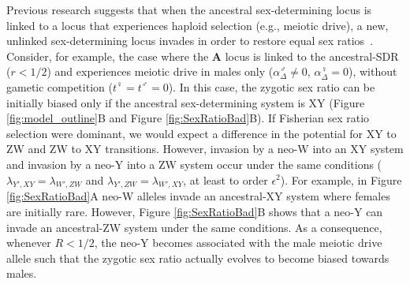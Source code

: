\documentclass[10pt,letterpaper]{article}
\begin{document}
Previous research suggests that when the ancestral sex-determining locus is linked to a locus that experiences haploid selection (e.g., meiotic drive), a new, unlinked sex-determining locus invades in order to restore equal sex ratios~\cite{Kozielska:2010vm}. 
Consider, for example, the case where the \textbf{A} locus is linked to the ancestral-SDR ($r<1/2$) and experiences meiotic drive in males only ($\alpha^\male_\Delta \neq 0$, $\alpha^\female_\Delta=0$), without gametic competition ($t^\female=t^\male=0$).
In this case, the zygotic sex ratio can be initially biased only if the ancestral sex-determining system is XY (Figure \ref{fig:model_outline}B and Figure \ref{fig:SexRatioBad}B). 
If Fisherian sex ratio selection were dominant, we would expect a difference in the potential for XY to ZW and ZW to XY transitions. 
However, invasion by a neo-W into an XY system and invasion by a neo-Y into a ZW system occur under the same conditions ($\lambda_{Y',XY}=\lambda_{W',ZW}$ and $\lambda_{Y',ZW}=\lambda_{W',XY}$, at least to order $\epsilon^2$).
For example, in Figure \ref{fig:SexRatioBad}A neo-W alleles invade an ancestral-XY system where females are initially rare.
However, Figure \ref{fig:SexRatioBad}B shows that a neo-Y can invade an ancestral-ZW system under the same conditions. 
As a consequence, whenever $R<1/2$, the neo-Y becomes associated with the male meiotic drive allele such that the zygotic sex ratio actually evolves to become biased towards males.

\end{document}

